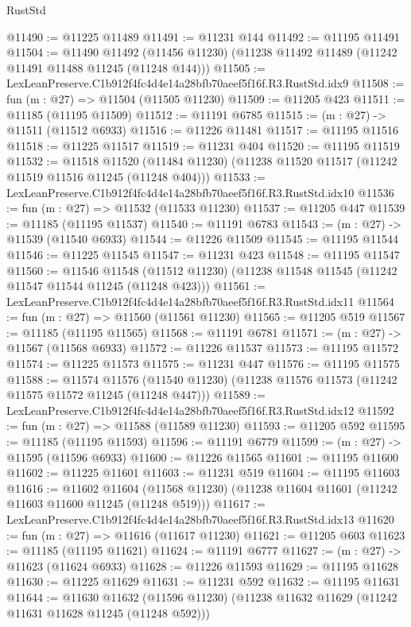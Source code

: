 \begin{lexlean}{RustStd}
\begin{coremodule}
@11490 := @11225 @11489
@11491 := @11231 @144
@11492 := @11195 @11491
@11504 := @11490
    @11492
    (@11456 @11230)
    (@11238 @11492 @11489 (@11242 @11491 @11488 @11245 (@11248 @144)))
@11505 := LexLeanPreserve.C1b912f4fc4d4e14a28bfb70aeef5f16f.R3.RustStd.idx9
@11508 := fun (m : @27) => @11504 (@11505 @11230)
@11509 := @11205 @423
@11511 := @11185 (@11195 @11509)
@11512 := @11191 @6785
@11515 := (m : @27) -> @11511 (@11512 @6933)
@11516 := @11226 @11481
@11517 := @11195 @11516
@11518 := @11225 @11517
@11519 := @11231 @404
@11520 := @11195 @11519
@11532 := @11518
    @11520
    (@11484 @11230)
    (@11238 @11520 @11517 (@11242 @11519 @11516 @11245 (@11248 @404)))
@11533 := LexLeanPreserve.C1b912f4fc4d4e14a28bfb70aeef5f16f.R3.RustStd.idx10
@11536 := fun (m : @27) => @11532 (@11533 @11230)
@11537 := @11205 @447
@11539 := @11185 (@11195 @11537)
@11540 := @11191 @6783
@11543 := (m : @27) -> @11539 (@11540 @6933)
@11544 := @11226 @11509
@11545 := @11195 @11544
@11546 := @11225 @11545
@11547 := @11231 @423
@11548 := @11195 @11547
@11560 := @11546
    @11548
    (@11512 @11230)
    (@11238 @11548 @11545 (@11242 @11547 @11544 @11245 (@11248 @423)))
@11561 := LexLeanPreserve.C1b912f4fc4d4e14a28bfb70aeef5f16f.R3.RustStd.idx11
@11564 := fun (m : @27) => @11560 (@11561 @11230)
@11565 := @11205 @519
@11567 := @11185 (@11195 @11565)
@11568 := @11191 @6781
@11571 := (m : @27) -> @11567 (@11568 @6933)
@11572 := @11226 @11537
@11573 := @11195 @11572
@11574 := @11225 @11573
@11575 := @11231 @447
@11576 := @11195 @11575
@11588 := @11574
    @11576
    (@11540 @11230)
    (@11238 @11576 @11573 (@11242 @11575 @11572 @11245 (@11248 @447)))
@11589 := LexLeanPreserve.C1b912f4fc4d4e14a28bfb70aeef5f16f.R3.RustStd.idx12
@11592 := fun (m : @27) => @11588 (@11589 @11230)
@11593 := @11205 @592
@11595 := @11185 (@11195 @11593)
@11596 := @11191 @6779
@11599 := (m : @27) -> @11595 (@11596 @6933)
@11600 := @11226 @11565
@11601 := @11195 @11600
@11602 := @11225 @11601
@11603 := @11231 @519
@11604 := @11195 @11603
@11616 := @11602
    @11604
    (@11568 @11230)
    (@11238 @11604 @11601 (@11242 @11603 @11600 @11245 (@11248 @519)))
@11617 := LexLeanPreserve.C1b912f4fc4d4e14a28bfb70aeef5f16f.R3.RustStd.idx13
@11620 := fun (m : @27) => @11616 (@11617 @11230)
@11621 := @11205 @603
@11623 := @11185 (@11195 @11621)
@11624 := @11191 @6777
@11627 := (m : @27) -> @11623 (@11624 @6933)
@11628 := @11226 @11593
@11629 := @11195 @11628
@11630 := @11225 @11629
@11631 := @11231 @592
@11632 := @11195 @11631
@11644 := @11630
    @11632
    (@11596 @11230)
    (@11238 @11632 @11629 (@11242 @11631 @11628 @11245 (@11248 @592)))

\end{coremodule}
\end{lexlean}
